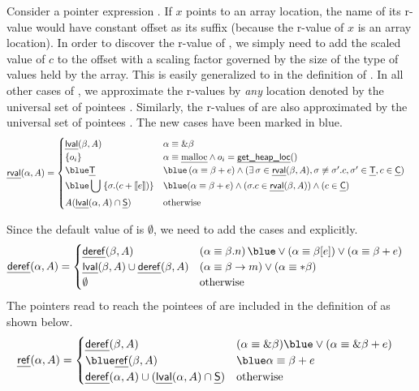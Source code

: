 \documentclass[a4paper,11pt,fleqn]{article}
\newcommand{\const}{\text{\sf\em C\/}\xspace}
\newcommand{\eval}[1]{\text{$\llbracket{#1}\rrbracket$}}
\begin{document}
Consider a pointer expression . If $x$ points to an array
location, the name of its r-value would have constant offset as its suffix 
(because the r-value of $x$ is an array location). In order to discover
the r-value of , we simply need to add the scaled value of
$c$ to the offset with a scaling factor governed by the size of the type
of values held by the array. This is easily generalized to  in the definition of \rval. 
In all other cases of , we
approximate the r-values by {\em any\/} location denoted by the universal
set of pointees \target. Similarly, the r-values of  are 
also approximated by the universal set of pointees \target.
The new cases have been marked in blue.
\begin{align}
\rval(\alpha, A) & = 
		\begin{cases}
		\lval(\beta,A)
			& \alpha \equiv \&\beta
			\\
		\{ o_i \}	
			& \alpha \equiv \text{\em malloc} \wedge o_i = \allocsite()
			\\
		\blue
		\target
				& 
		\blue
				\left(\alpha \equiv \beta + e \right) \wedge
				\left(\exists \,\sigma \in \rval(\beta, A), 
				\sigma \not\equiv \sigma'.c, \sigma' \in \target, c \in \const\right)
			\\
		\blue
			\displaystyle 
			\bigcup \; \{ \sigma.(c + \eval{e}) \} \rule[-.85em]{0em}{2.1em}
				& 
		\blue
				(\alpha \equiv \beta + e) 
				\wedge
				(\sigma.c \in \rval(\beta,A))
				\wedge
				(c \in \const)
			\\
A(\lval(\alpha,A) \cap \source) 
			& \text{otherwise}
		\end{cases}
\end{align}

Since the default value of \derefp is $\emptyset$, we need to add the cases 
\text{$\beta[e]$} and  explicitly.
\begin{align}
\derefp(\alpha,A) & =  
		\begin{cases}
		\derefp(\beta,A) 
				& \left(\alpha \equiv \beta.n\right)
				\blue
					\vee
				 \left(\alpha \equiv \beta[e]\right)
					\vee
				 \left(\alpha \equiv \beta + e\right)
			\\
		\lval(\beta,A) \cup \derefp(\beta,A) 
				& (\alpha \equiv \beta\rightarrow m)  \vee (\alpha \equiv *\beta) 
			\\
		\emptyset	& \text{otherwise}
		\end{cases}
\end{align}
The pointers read to reach the pointees of  are included in the definition of
\rval as shown below.
\begin{align}
\refp(\alpha,A) & =  
		\begin{cases}
		\derefp(\beta,A) 
			& (\alpha \equiv \&\beta) 
				\blue
			\vee
			(\alpha \equiv \&\beta + e)
			\\
\blue
		\refp(\beta,A) & 
			\blue
			\alpha \equiv \beta + e
			\\
		\derefp(\alpha,A) \cup \left(\lval(\alpha,A) \cap \source\right)
			&	\text{otherwise}
		\end{cases}
\end{align}
\end{document}
